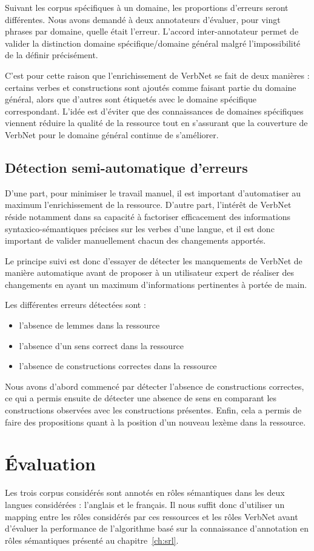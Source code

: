 Suivant les corpus spécifiques à un domaine, les proportions d'erreurs seront
différentes. Nous avons demandé à deux annotateurs d'évaluer, pour vingt
phrases par domaine, quelle était l'erreur. L'accord inter-annotateur permet de
valider la distinction domaine spécifique/domaine général malgré
l'impossibilité de la définir précisément.

C'est pour cette raison que l'enrichissement de VerbNet se fait de deux
manières : certains verbes et constructions sont ajoutés comme faisant partie
du domaine général, alors que d'autres sont étiquetés avec le domaine
spécifique correspondant. L'idée est d'éviter que des connaissances de domaines
spécifiques viennent réduire la qualité de la ressource tout en s'assurant que
la couverture de VerbNet pour le domaine général continue de s'améliorer.

\subsection{Détection semi-automatique d'erreurs}

D'une part, pour minimiser le travail manuel, il est important d'automatiser au
maximum l'enrichissement de la ressource. D'autre part, l'intérêt de VerbNet
réside notamment dans sa capacité à factoriser efficacement des informations
syntaxico-sémantiques précises sur les verbes d'une langue, et il est donc
important de valider manuellement chacun des changements apportés.

Le principe suivi est donc d'essayer de détecter les manquements de VerbNet de
manière automatique avant de proposer à un utilisateur expert de réaliser des
changements en ayant un maximum d'informations pertinentes à portée de main.

Les différentes erreurs détectées sont :
\begin{itemize}
    \item l'absence de lemmes dans la ressource
    \item l'absence d'un sens correct dans la ressource
    \item l'absence de constructions correctes dans la ressource
\end{itemize}

Nous avons d'abord commencé par détecter l'absence de constructions correctes,
ce qui a permis ensuite de détecter une absence de sens en comparant les
constructions observées avec les constructions présentes. Enfin, cela a permis
de faire des propositions quant à la position d'un nouveau lexème dans la
ressource.

\section{Évaluation}

Les trois corpus considérés sont annotés en rôles sémantiques dans les deux
langues considérées : l'anglais et le français. Il nous suffit donc d'utiliser
un mapping entre les rôles considérés par ces ressources et les rôles VerbNet
avant d'évaluer la performance de l'algorithme basé sur la connaissance
d'annotation en rôles sémantiques présenté au chapitre~\ref{ch:srl}.

